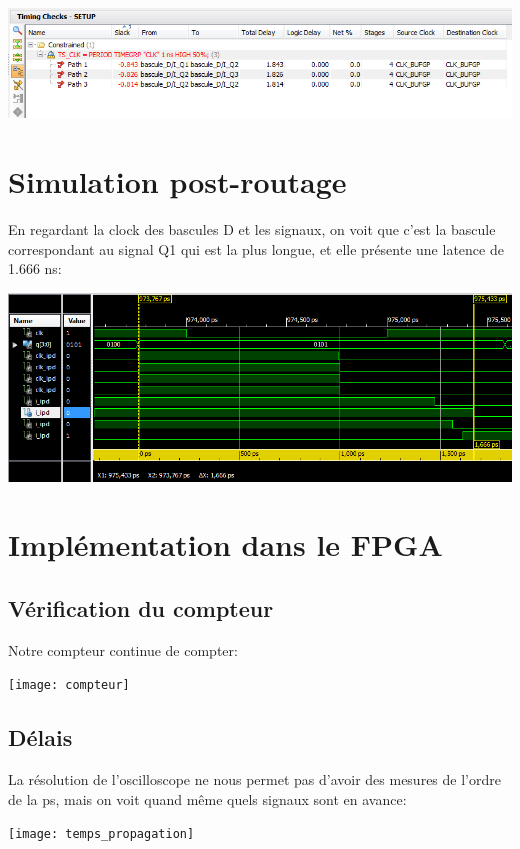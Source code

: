 \documentclass{article}
\begin{document}
\includegraphics[width=\linewidth]{time_constraint_warning_1ns_plan_ahead}

\section{Simulation post-routage}

En regardant la clock des bascules D et les signaux, on voit que c’est la bascule correspondant au signal Q1 qui est la plus
longue, et elle présente une latence de 1.666 ns:

\includegraphics{entree_bascule}

\section{Implémentation dans le FPGA}

\subsection{Vérification du compteur}

Notre compteur continue de compter:

\texttt{[image: compteur]}

\subsection{Délais}

La résolution de l’oscilloscope ne nous permet pas d’avoir des mesures de l’ordre de la ps, mais on voit quand
même quels signaux sont en avance:

\texttt{[image: temps\_propagation]}
\end{document}

